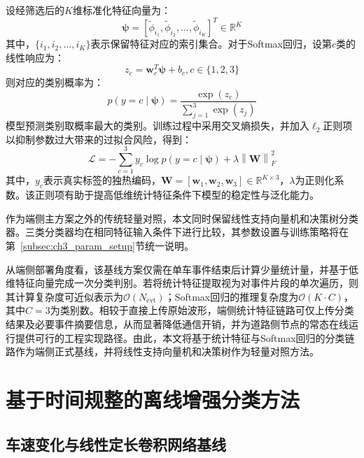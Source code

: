 \documentclass{xdupgthesis}
\begin{document}
设经筛选后的$K$维标准化特征向量为：
\begin{equation}
\label{eq:ch3_edge_selected_feat}
    \boldsymbol{\psi}=
    [\tilde{\phi}_{i_1},\tilde{\phi}_{i_2},\ldots,\tilde{\phi}_{i_K}]^T
    \in\mathbb{R}^{K}
\end{equation}
其中，$\{i_1,i_2,\ldots,i_K\}$表示保留特征对应的索引集合。对于Softmax回归，设第$c$类的线性响应为：
\begin{equation}
    z_c=\mathbf{w}_c^T\boldsymbol{\psi}+b_c, c\in\{1,2,3\}
\end{equation}
则对应的类别概率为：
\begin{equation}
    p(y=c\mid \boldsymbol{\psi})=\frac{\exp(z_c)}{\sum_{j=1}^{3}\exp(z_j)}
\end{equation}
模型预测类别取概率最大的类别。训练过程中采用交叉熵损失，并加入$\ell_2$正则项以抑制参数过大带来的过拟合风险，得到：
\begin{equation}
    \mathcal{L}=-\sum_{c=1}^{3} y_c\log p(y=c\mid \boldsymbol{\psi})
    +\lambda\left\|\mathbf{W}\right\|_F^2
\end{equation}
其中，$y_c$表示真实标签的独热编码，$\mathbf{W}=[\mathbf{w}_1,\mathbf{w}_2,\mathbf{w}_3]\in\mathbb{R}^{K\times 3}$，$\lambda$为正则化系数。该正则项有助于提高低维统计特征条件下模型的稳定性与泛化能力。

作为端侧主方案之外的传统轻量对照，本文同时保留线性支持向量机和决策树分类器。三类分类器均在相同特征输入条件下进行比较，其参数设置与训练策略将在第~\ref{subsec:ch3_param_setup}节统一说明。

从端侧部署角度看，该基线方案仅需在单车事件结束后计算少量统计量，并基于低维特征向量完成一次分类判别。若将统计特征提取视为对事件片段的单次遍历，则其计算复杂度可近似表示为$\mathcal{O}(N_{\mathrm{evt}})$；Softmax回归的推理复杂度为$\mathcal{O}(K\cdot C)$，其中$C=3$为类别数。相较于直接上传原始波形，端侧统计特征链路可仅上传分类结果及必要事件摘要信息，从而显著降低通信开销，并为道路侧节点的常态在线运行提供可行的工程实现路径。由此，本文将基于统计特征与Softmax回归的分类链路作为端侧正式基线，并将线性支持向量机和决策树作为轻量对照方法。

\section{基于时间规整的离线增强分类方法}
\label{sec:ch3_offline}

\subsection{车速变化与线性定长卷积网络基线}
\label{subsec:ch3_offline_base}
\end{document}

